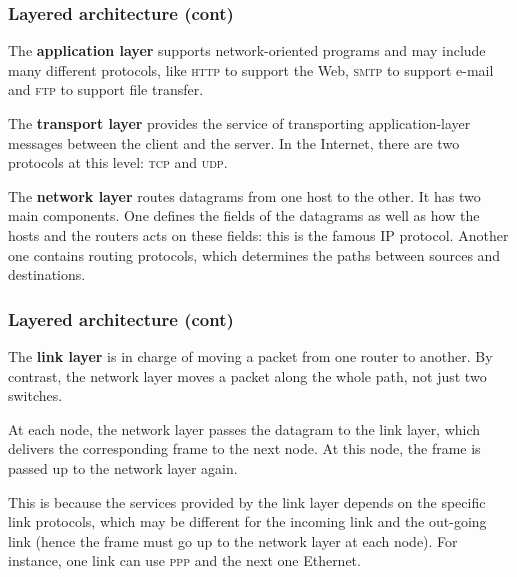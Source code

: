 %
\begin{frame}
\frametitle{Layered architecture (cont)}

The \textbf{application layer} supports network-oriented programs
and may include many different protocols, like \textsc{http} to
support the Web, \textsc{smtp} to support e-mail and \textsc{ftp} to
support file transfer.

\bigskip

The \textbf{transport layer} provides the service of transporting
application-layer messages between the client and the server. In the
Internet, there are two protocols at this level: \textsc{tcp} and
\textsc{udp}.

\bigskip

The \textbf{network layer} routes datagrams from one host to the
other. It has two main components. One defines the fields of the
datagrams as well as how the hosts and the routers acts on these
fields: this is the famous \textsc{IP} protocol. Another one contains
routing protocols, which determines the paths between sources and
destinations. 

\end{frame}

%
\begin{frame}
\frametitle{Layered architecture (cont)}

The \textbf{link layer} is in charge of moving a packet from one
router to another. By contrast, the network layer moves a packet
along the whole path, not just two switches. 

\bigskip

At each node, the network layer passes the datagram to the link
layer, which delivers the corresponding frame to the next node. At
this node, the frame is passed up to the network layer again.

\bigskip

This is because the services provided by the link layer depends on the
specific link protocols, which may be different for the incoming link
and the out-going link (hence the frame must go up to the network
layer at each node). For instance, one link can use \textsc{ppp} and
the next one Ethernet.

\end{frame}


